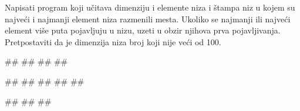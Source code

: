 \begin{Exercise}[label=p.razmena_min_max] 
Napisati program koji učitava dimenziju i elemente niza i štampa niz u kojem su najveći i najmanji element niza razmenili mesta. Ukoliko se najmanji ili najveći element više puta pojavljuju u nizu, uzeti u obzir njihova prva pojavljivanja. Pretpostaviti da je dimenzija niza broj koji nije veći od 100.  %

\begin{miditest}
\begin{upotreba}{1}
#\naslovInt#
##
##
##
\end{upotreba}
\end{miditest}
\begin{miditest}
\begin{upotreba}{2}
#\naslovInt#
##
##
##
##
\end{upotreba}
\end{miditest}

\begin{miditest}
\begin{upotreba}{3}
#\naslovInt#
##
##
\end{upotreba}
\end{miditest}
\end{Exercise}

\ifresenja
\begin{Answer}[ref=p.razmena_min_max]
\end{Answer}
\fi


